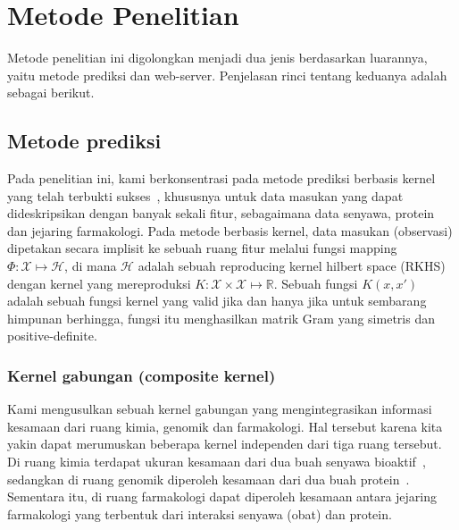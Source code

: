 \chapter{Metode Penelitian}

Metode penelitian ini digolongkan menjadi dua jenis berdasarkan luarannya, yaitu metode prediksi dan web-server.
Penjelasan rinci tentang keduanya adalah sebagai berikut.

\section{Metode prediksi}
Pada penelitian ini, kami berkonsentrasi pada metode prediksi berbasis kernel yang telah terbukti sukses~\cite{Scholkopf:2001,2546}, 
khususnya untuk data masukan yang dapat dideskripsikan dengan banyak sekali fitur, sebagaimana data senyawa, protein dan jejaring farmakologi.
Pada metode berbasis kernel, data masukan (observasi) dipetakan secara implisit ke sebuah ruang fitur melalui 
fungsi mapping $\Phi: \mathcal{X} \mapsto \mathcal{H}$, di mana $\mathcal{H}$ adalah sebuah reproducing kernel hilbert space (RKHS) dengan kernel yang mereproduksi $ K: \mathcal{X} \times \mathcal{X} \mapsto \mathbb{R}$.
Sebuah fungsi $K(x,x')$ adalah sebuah fungsi kernel yang valid jika dan hanya jika untuk sembarang himpunan berhingga, fungsi itu menghasilkan matrik Gram yang simetris dan positive-definite. 

\subsection{Kernel gabungan (composite kernel)} 
Kami mengusulkan sebuah kernel gabungan yang mengintegrasikan informasi kesamaan dari ruang kimia, genomik dan farmakologi.
Hal tersebut karena kita yakin dapat merumuskan beberapa kernel independen dari tiga ruang tersebut.
Di ruang kimia terdapat ukuran kesamaan dari dua buah senyawa bioaktif~\cite{Ralaivola20051093}, 
sedangkan di ruang genomik diperoleh kesamaan dari dua buah protein~\cite{Borgwardt:2005}.
Sementara itu, di ruang farmakologi dapat diperoleh kesamaan antara jejaring farmakologi yang terbentuk dari interaksi senyawa (obat) dan protein.

